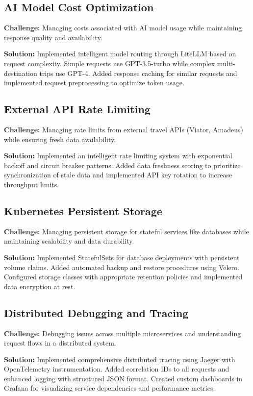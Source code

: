 \subsection{AI Model Cost Optimization}
\textbf{Challenge:} Managing costs associated with AI model usage while maintaining response quality and availability.

\textbf{Solution:} Implemented intelligent model routing through LiteLLM based on request complexity. Simple requests use GPT-3.5-turbo while complex multi-destination trips use GPT-4. Added response caching for similar requests and implemented request preprocessing to optimize token usage.

\subsection{External API Rate Limiting}
\textbf{Challenge:} Managing rate limits from external travel APIs (Viator, Amadeus) while ensuring fresh data availability.

\textbf{Solution:} Implemented an intelligent rate limiting system with exponential backoff and circuit breaker patterns. Added data freshness scoring to prioritize synchronization of stale data and implemented API key rotation to increase throughput limits.

\subsection{Kubernetes Persistent Storage}
\textbf{Challenge:} Managing persistent storage for stateful services like databases while maintaining scalability and data durability.

\textbf{Solution:} Implemented StatefulSets for database deployments with persistent volume claims. Added automated backup and restore procedures using Velero. Configured storage classes with appropriate retention policies and implemented data encryption at rest.

\subsection{Distributed Debugging and Tracing}
\textbf{Challenge:} Debugging issues across multiple microservices and understanding request flows in a distributed system.

\textbf{Solution:} Implemented comprehensive distributed tracing using Jaeger with OpenTelemetry instrumentation. Added correlation IDs to all requests and enhanced logging with structured JSON format. Created custom dashboards in Grafana for visualizing service dependencies and performance metrics.

